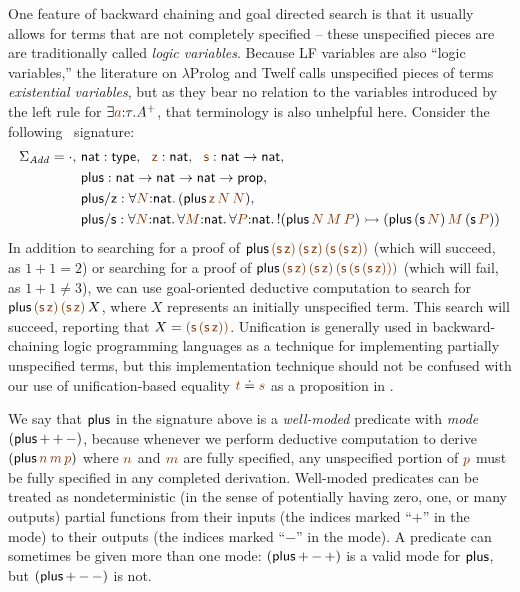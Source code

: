 One feature of backward chaining and goal directed search is that it
usually allows for terms that are not completely specified -- these
unspecified pieces are are traditionally called {\it logic
  variables}. Because LF variables are also ``logic variables,''
the literature on $\lambda$Prolog and Twelf calls unspecified
pieces of terms {\it existential variables}, 
but as they bear no relation to the variables introduced
by the left rule for $\exists \lf{a}{:}\tau. A^+$, 
that terminology is also unhelpful
here. Consider the following \sls~signature:
\begin{align*}
 \Sigma_{\it Add} = \cdot, 
~&{\sf nat} : {\sf type}, 
~~\lf{\sf z} : {\sf nat}, 
~~\lf{\sf s} : {\sf nat} \rightarrow {\sf nat},\\
~&{\sf plus} : {\sf nat} \rightarrow {\sf nat} \rightarrow {\sf nat} 
                 \rightarrow {\sf prop},\\
~&{\sf plus/z} : \forall \lf{N}{:}{\sf nat}.\,
({\sf plus}\,\lf{\sf z}\,\lf{N}\,\lf{N}),\\
~&{\sf plus/s} : \forall \lf{N}{:}{\sf nat}.\, 
                 \forall \lf{M}{:}{\sf nat}.\, 
                 \forall \lf{P}{:}{\sf nat}.\,
{!}({\sf plus}\,\lf{N}\,\lf{M}\,\lf{P})
\lefti ({\sf plus}\,({\sf s}\,\lf{N})\,\lf{M}\,({\sf s}\,\lf{P}))
\end{align*}
In addition to searching for a proof of ${\sf plus}\,\lf{\sf
  (s\,z)}\,\lf{\sf (s\,z)}\,\lf{\sf (s\,(s\,z))}$ (which will succeed,
as $1 + 1 = 2$) or searching for a proof of ${\sf plus}\,\lf{\sf
  (s\,z)}\,\lf{\sf (s\,z)}\,\lf{\sf (s\,(s\,(s\,z)))}$ (which will
fail, as $1 + 1 \neq 3$), we can use goal-oriented deductive
computation to search for ${\sf plus}\,\lf{\sf (s\,z)}\,\lf{\sf
  (s\,z)}\,X$, where $X$ represents an initially unspecified term.
This search will succeed, reporting that $X = \lf{\sf
  (s\,(s\,z))}$. Unification is generally used in backward-chaining
logic programming languages as a technique for implementing partially
unspecified terms, but this implementation technique should not be
confused with our use of unification-based equality $\lf{t} \doteq
\lf{s}$ as a proposition in \sls.

We say that ${\sf plus}$ in the signature above is a {\it well-moded}
predicate with {\it mode} $({\sf plus}\,{+}\,{+}\,{-})$, because
whenever we perform deductive computation to derive $({\sf
  plus}\,\lf{n}\,\lf{m}\,\lf{p})$ where $\lf{n}$ and $\lf{m}$ are
fully specified, any unspecified portion of $\lf{p}$ must be fully
specified in any completed derivation. Well-moded predicates can be
treated as nondeterministic (in the sense of potentially having zero,
one, or many outputs) partial functions from their inputs (the
indices marked ``${+}$'' in the mode) to their outputs (the indices
marked ``${-}$'' in the mode). A predicate can sometimes be given more
than one mode: $({\sf plus}\,{+}\,{-}\,{+})$ is a valid mode for ${\sf
  plus}$, but $({\sf plus}\,{+}\,{-}\,{-})$ is not.

